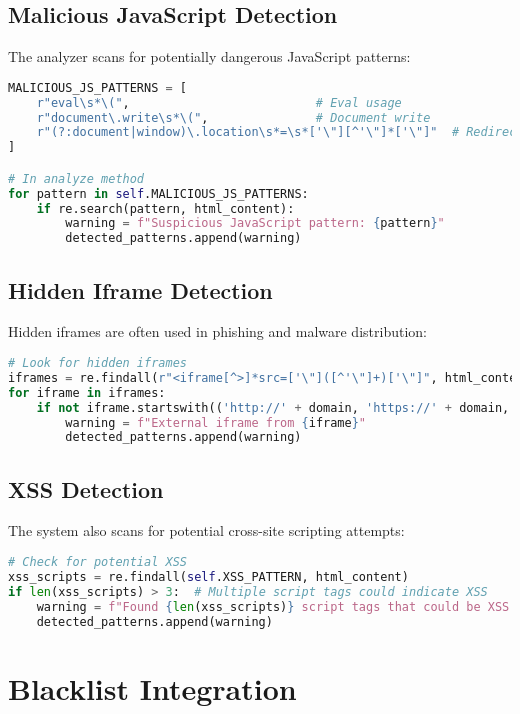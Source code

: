 \subsection{Malicious JavaScript Detection}
The analyzer scans for potentially dangerous JavaScript patterns:

\begin{lstlisting}[language=Python, caption=Malicious JavaScript Detection]
MALICIOUS_JS_PATTERNS = [
    r"eval\s*\(",                          # Eval usage
    r"document\.write\s*\(",               # Document write
    r"(?:document|window)\.location\s*=\s*['\"][^'\"]*['\"]"  # Redirects
]

# In analyze method
for pattern in self.MALICIOUS_JS_PATTERNS:
    if re.search(pattern, html_content):
        warning = f"Suspicious JavaScript pattern: {pattern}"
        detected_patterns.append(warning)
\end{lstlisting}

\subsection{Hidden Iframe Detection}
Hidden iframes are often used in phishing and malware distribution:

\begin{lstlisting}[language=Python, caption=Hidden Iframe Detection]
# Look for hidden iframes
iframes = re.findall(r"<iframe[^>]*src=['\"]([^'\"]+)['\"]", html_content)
for iframe in iframes:
    if not iframe.startswith(('http://' + domain, 'https://' + domain, '/')):
        warning = f"External iframe from {iframe}"
        detected_patterns.append(warning)
\end{lstlisting}

\subsection{XSS Detection}
The system also scans for potential cross-site scripting attempts:

\begin{lstlisting}[language=Python, caption=XSS Detection]
# Check for potential XSS
xss_scripts = re.findall(self.XSS_PATTERN, html_content)
if len(xss_scripts) > 3:  # Multiple script tags could indicate XSS
    warning = f"Found {len(xss_scripts)} script tags that could be XSS attempts"
    detected_patterns.append(warning)
\end{lstlisting}

\section{Blacklist Integration}

